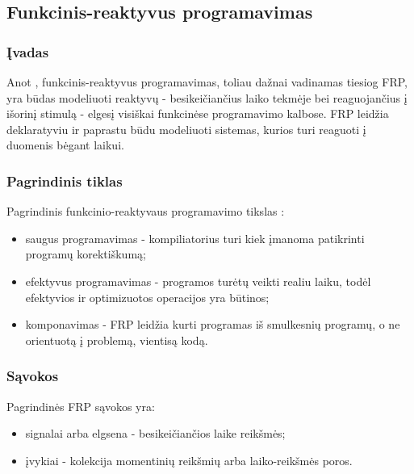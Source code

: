 \subsection{Funkcinis-reaktyvus programavimas}

\subsubsection{Įvadas}

Anot \cite{Survey}, funkcinis-reaktyvus programavimas, toliau dažnai vadinamas tiesiog FRP, yra būdas modeliuoti reaktyvų - besikeičiančius laiko tekmėje bei reaguojančius į išorinį stimulą - elgesį visiškai funkcinėse programavimo kalbose. FRP leidžia deklaratyviu ir paprastu būdu modeliuoti sistemas, kurios turi reaguoti į duomenis bėgant laikui.

\subsubsection{Pagrindinis tiklas}

Pagrindinis funkcinio-reaktyvaus programavimo tikslas \cite{Survey}:

\begin{itemize}

	\item saugus programavimas - kompiliatorius turi kiek įmanoma patikrinti programų korektiškumą;

	\item efektyvus programavimas - programos turėtų veikti realiu laiku, todėl efektyvios ir optimizuotos operacijos yra būtinos;

	\item komponavimas - FRP leidžia kurti programas iš smulkesnių programų, o ne orientuotą į problemą, vientisą kodą.

\end{itemize}

\subsubsection{Sąvokos}

Pagrindinės FRP sąvokos yra:

\begin{itemize}

	\item signalai arba elgsena - besikeičiančios laike reikšmės;

	\item įvykiai - kolekcija momentinių reikšmių arba laiko-reikšmės poros.

\end{itemize}

